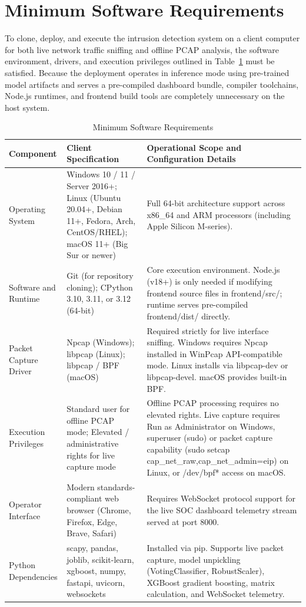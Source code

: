 \documentclass[12pt,a4paper]{report}
\begin{document}
\section{Minimum Software Requirements}

To clone, deploy, and execute the intrusion detection system on a client computer for both live network traffic sniffing and offline PCAP analysis, the software environment, drivers, and execution privileges outlined in Table~\ref{tab:software_requirements} must be satisfied. Because the deployment operates in inference mode using pre-trained model artifacts and serves a pre-compiled dashboard bundle, compiler toolchains, Node.js runtimes, and frontend build tools are completely unnecessary on the host system.

\begin{table}[H]
\centering
\small
\renewcommand{\arraystretch}{1.2}
\begin{tabularx}{\textwidth}{|>{\raggedright\arraybackslash}p{2.8cm}|>{\raggedright\arraybackslash}p{4.2cm}|>{\raggedright\arraybackslash}X|}
\hline
\textbf{Component} & \textbf{Client Specification} & \textbf{Operational Scope and Configuration Details} \\
\hline
Operating System & Windows 10 / 11 / Server 2016+; Linux (Ubuntu 20.04+, Debian 11+, Fedora, Arch, CentOS/RHEL); macOS 11+ (Big Sur or newer) & Full 64-bit architecture support across x86\_64 and ARM processors (including Apple Silicon M-series). \\
\hline
Software and Runtime & Git (for repository cloning); CPython 3.10, 3.11, or 3.12 (64-bit) & Core execution environment. Node.js (v18+) is only needed if modifying frontend source files in frontend/src/; runtime serves pre-compiled frontend/dist/ directly. \\
\hline
Packet Capture Driver & Npcap (Windows); libpcap (Linux); libpcap / BPF (macOS) & Required strictly for live interface sniffing. Windows requires Npcap installed in WinPcap API-compatible mode. Linux installs via libpcap-dev or libpcap-devel. macOS provides built-in BPF. \\
\hline
Execution Privileges & Standard user for offline PCAP mode; Elevated / administrative rights for live capture mode & Offline PCAP processing requires no elevated rights. Live capture requires Run as Administrator on Windows, superuser (sudo) or packet capture capability (sudo setcap cap\_net\_raw,cap\_net\_admin=eip) on Linux, or /dev/bpf* access on macOS. \\
\hline
Operator Interface & Modern standards-compliant web browser (Chrome, Firefox, Edge, Brave, Safari) & Requires WebSocket protocol support for the live SOC dashboard telemetry stream served at port 8000. \\
\hline
Python Dependencies & scapy, pandas, joblib, scikit-learn, xgboost, numpy, fastapi, uvicorn, websockets & Installed via pip. Supports live packet capture, model unpickling (VotingClassifier, RobustScaler), XGBoost gradient boosting, matrix calculation, and WebSocket telemetry. \\
\hline
\end{tabularx}
\caption{Minimum Software Requirements}
\label{tab:software_requirements}
\end{table}
\end{document}

